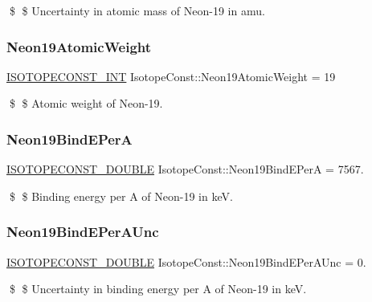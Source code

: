 \$ \$ Uncertainty in atomic mass of Neon-\/19 in amu. \mbox{\label{group___isotope_const-_neon-_ne19_ga7b4476dc167f3800843a59e84a88ff4f}} 
\subsubsection{\texorpdfstring{Neon19\+Atomic\+Weight}{Neon19AtomicWeight}}
{\footnotesize\ttfamily \mbox{\hyperlink{group___isotope_const-_macros_ga5f18360b3e99483a35c32d789e62621c}{I\+S\+O\+T\+O\+P\+E\+C\+O\+N\+S\+T\+\_\+\+I\+NT}} Isotope\+Const\+::\+Neon19\+Atomic\+Weight = 19}

\$ \$ Atomic weight of Neon-\/19. \mbox{\label{group___isotope_const-_neon-_ne19_ga5cc6fdbca80c885534f692b4e0e257a2}} 
\subsubsection{\texorpdfstring{Neon19\+Bind\+E\+PerA}{Neon19BindEPerA}}
{\footnotesize\ttfamily \mbox{\hyperlink{group___isotope_const-_macros_ga8f45a7272ce02c0b4c65c44636ed719a}{I\+S\+O\+T\+O\+P\+E\+C\+O\+N\+S\+T\+\_\+\+D\+O\+U\+B\+LE}} Isotope\+Const\+::\+Neon19\+Bind\+E\+PerA = 7567.}

\$ \$ Binding energy per A of Neon-\/19 in keV. \mbox{\label{group___isotope_const-_neon-_ne19_ga57b2cc765eecf9d520b26df111faee17}} 
\subsubsection{\texorpdfstring{Neon19\+Bind\+E\+Per\+A\+Unc}{Neon19BindEPerAUnc}}
{\footnotesize\ttfamily \mbox{\hyperlink{group___isotope_const-_macros_ga8f45a7272ce02c0b4c65c44636ed719a}{I\+S\+O\+T\+O\+P\+E\+C\+O\+N\+S\+T\+\_\+\+D\+O\+U\+B\+LE}} Isotope\+Const\+::\+Neon19\+Bind\+E\+Per\+A\+Unc = 0.}

\$ \$ Uncertainty in binding energy per A of Neon-\/19 in keV. \mbox{\label{group___isotope_const-_neon-_ne19_ga1e1adb0a933de798968f8f9848dcf057}} 
